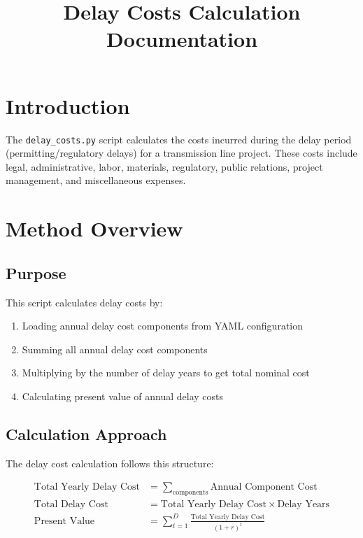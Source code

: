 \documentclass[12pt]{article}
\title{Delay Costs Calculation Documentation}
\author{}
\date{}
\begin{document}
\maketitle

\section{Introduction}

The \texttt{delay\_costs.py} script calculates the costs incurred during the delay period (permitting/regulatory delays) for a transmission line project. These costs include legal, administrative, labor, materials, regulatory, public relations, project management, and miscellaneous expenses.

\section{Method Overview}

\subsection{Purpose}

This script calculates delay costs by:
\begin{enumerate}
    \item Loading annual delay cost components from YAML configuration
    \item Summing all annual delay cost components
    \item Multiplying by the number of delay years to get total nominal cost
    \item Calculating present value of annual delay costs
\end{enumerate}

\subsection{Calculation Approach}

The delay cost calculation follows this structure:

\begin{align}
\text{Total Yearly Delay Cost} &= \sum_{\text{components}} \text{Annual Component Cost} \\
\text{Total Delay Cost} &= \text{Total Yearly Delay Cost} \times \text{Delay Years} \\
\text{Present Value} &= \sum_{t=1}^{D} \frac{\text{Total Yearly Delay Cost}}{(1 + r)^t}
\end{align}
\end{document}
